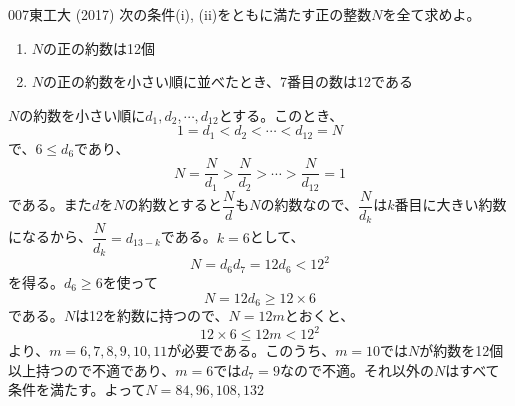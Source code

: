 \begin{thm}{007}{}{東工大 (2017)}
 次の条件(i), (ii)をともに満たす正の整数$N$を全て求めよ。
 \begin{enumerate}[label=\roman*,align=CenterWithParen]
  \item $N$の正の約数は12個
  \item $N$の正の約数を小さい順に並べたとき、7番目の数は12である
 \end{enumerate}
\end{thm}

$N$の約数を小さい順に$d_1, d_2,\cdots, d_{12}$とする。このとき、
\[ 1=d_1<d_2<\cdots<d_{12}=N \]
で、$6\leq d_6$であり、
\[ N=\frac{N}{d_1}>\frac{N}{d_2}>\cdots>\frac{N}{d_{12}}=1 \]
である。また$d$を$N$の約数とすると$\dfrac{N}{d}$も$N$の約数なので、$\dfrac{N}{d_k}$は$k$番目に大きい約数になるから、$\dfrac{N}{d_k}=d_{13-k}$である。$k=6$として、
\[ N=d_6d_7=12d_6<12^2 \]
を得る。$d_6\geq 6$を使って
\[ N=12d_6\geq 12\times 6 \]
である。$N$は12を約数に持つので、$N=12m$とおくと、
\[ 12\times 6\leq 12m < 12^2 \]
より、$m=6, 7, 8, 9, 10, 11$が必要である。このうち、$m=10$では$N$が約数を12個以上持つので不適であり、$m=6$では$d_7=9$なので不適。それ以外の$N$はすべて条件を満たす。よって$N=84, 96, 108, 132$